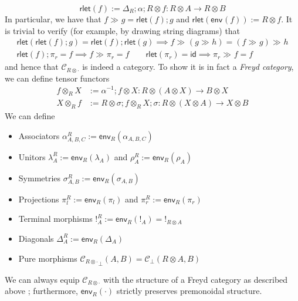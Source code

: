 \documentclass[acmsmall,screen,review]{acmart}
\newcommand{\mc}[1]{\ensuremath{\mathcal{#1}}}
\newcommand{\ms}[1]{\ensuremath{\mathsf{#1}}}
\newcommand{\dmor}[1]{{\Delta}_{#1}}
\newcommand{\envcom}[2]{{#1}_{#2 \otimes \cdot}}
\newcommand{\rlmor}[1]{\ms{rlet}(#1)}
\newcommand{\rseq}[3]{#2 \gg_{#1} #3}
\newcommand{\toenv}[2]{\ms{env}_{#1}(#2)}
\newcommand{\envtn}[3]{{#2} \otimes_{#1} {#3}}
\begin{document}
\begin{equation}
  \rlmor{f} := \dmor{R} ; \alpha ; R \otimes f : R \otimes A \to R \otimes B
\end{equation}
In particular, we have that $\rseq{}{f}{g} = \rlmor{f} ; g$ and $\rlmor{\toenv{}{f}} := R \otimes
f$. It is trivial to verify (for example, by drawing string diagrams) that
\begin{equation}
  \begin{gathered}
  \rlmor{\rlmor{f} ; g} = \rlmor{f} ; \rlmor{g} 
  \implies \rseq{}{f}{(\rseq{}{g}{h})} = \rseq{}{(\rseq{}{f}{g})}{h} \\
  \rlmor{f} ; \pi_r = f \implies \rseq{}{f}{\pi_r} = f \qquad
  \rlmor{\pi_r} = \ms{id} \implies \rseq{}{\pi_r}{f} = f
\end{gathered}
\end{equation}
and hence that $\envcom{\mc{C}}{R}$ is indeed a category. To show it is in fact a \emph{Freyd
category}, we can define tensor functors
\begin{equation}
  \begin{aligned}
  \envtn{R}{f}{X} &:= \alpha^{-1} ; f \otimes X 
    : R \otimes (A \otimes X) \to B \otimes X \\
  \envtn{R}{X}{f} &:= R \otimes \sigma ; \envtn{R}{f}{X} ; \sigma
    : R \otimes (X \otimes A) \to X \otimes B
  \end{aligned}
\end{equation}
We can define
\begin{itemize}
  \item Associators $\alpha^R_{A, B, C} := \toenv{R}{\alpha_{A, B, C}}$
  \item Unitors $\lambda^R_A := \toenv{R}{\lambda_A}$ and $\rho^R_A := \toenv{R}{\rho_A}$
  \item Symmetries $\sigma^R_{A, B} := \toenv{R}{\sigma_{A, B}}$
  \item Projections $\pi_l^R := \toenv{R}{\pi_l}$ and $\pi_r^R := \toenv{R}{\pi_r}$
  \item Terminal morphisms $!^R_A := \toenv{R}{!_A} = !_{R \otimes A}$
  \item Diagonals $\Delta^R_A := \toenv{R}{\Delta_A}$
  \item Pure morphisms ${\envcom{\mc{C}}{R}}_\bot(A, B) = \mc{C}_{\bot}(R \otimes A, B)$
\end{itemize}
\begin{lemma}
  We can always equip $\envcom{\mc{C}}{R}$ with the structure of a Freyd category as described above
  ; furthermore, $\toenv{R}{\cdot}$ strictly preserves premonoidal structure.
\end{lemma}
\end{document}
